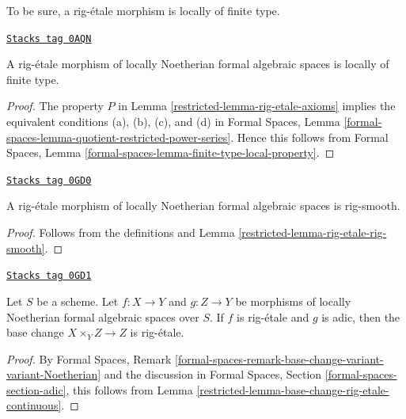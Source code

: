 To be sure, a rig-\'etale morphism is locally of finite type.

\begin{lemma}
\label{restricted-lemma-rig-etale-finite-type}
\href{https://stacks.math.columbia.edu/tag/0AQN}{\texttt{Stacks tag 0AQN}}

A rig-\'etale morphism of locally Noetherian formal algebraic spaces
is locally of finite type.
\end{lemma}

\begin{proof}

The property $P$ in Lemma \ref{restricted-lemma-rig-etale-axioms}
implies the equivalent conditions (a), (b), (c), and (d) in
Formal Spaces, Lemma
\ref{formal-spaces-lemma-quotient-restricted-power-series}.
Hence this follows from
Formal Spaces, Lemma \ref{formal-spaces-lemma-finite-type-local-property}.
\end{proof}

\begin{lemma}
\label{restricted-lemma-rig-etale-rig-smooth-morphism}
\href{https://stacks.math.columbia.edu/tag/0GD0}{\texttt{Stacks tag 0GD0}}

A rig-\'etale morphism of locally Noetherian formal algebraic spaces
is rig-smooth.
\end{lemma}

\begin{proof}

Follows from the definitions and
Lemma \ref{restricted-lemma-rig-etale-rig-smooth}.
\end{proof}

\begin{lemma}
\label{restricted-lemma-base-change-rig-etale}
\href{https://stacks.math.columbia.edu/tag/0GD1}{\texttt{Stacks tag 0GD1}}

Let $S$ be a scheme. Let $f : X \to Y$ and $g : Z \to Y$
be morphisms of locally Noetherian formal algebraic spaces over $S$.
If $f$ is rig-\'etale and $g$ is adic, then the base change
$X \times_Y Z \to Z$ is rig-\'etale.
\end{lemma}

\begin{proof}

By Formal Spaces, Remark
\ref{formal-spaces-remark-base-change-variant-variant-Noetherian}
and the discussion in Formal Spaces, Section
\ref{formal-spaces-section-adic},
this follows from Lemma \ref{restricted-lemma-base-change-rig-etale-continuous}.
\end{proof}

